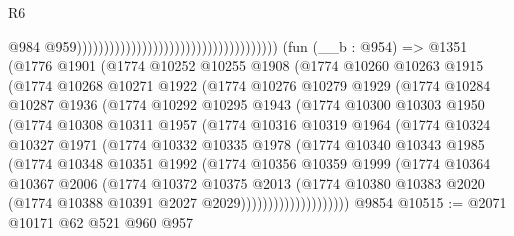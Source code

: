 \begin{lexlean}{R6}
\begin{coremodule}
                                                                              @984
                                                                              @959)))))))))))))))))))))))))))))))))))))
    (fun (__b : @954) =>
    @1351
      (@1776
        @1901
        (@1774
          @10252
          @10255
          @1908
          (@1774
            @10260
            @10263
            @1915
            (@1774
              @10268
              @10271
              @1922
              (@1774
                @10276
                @10279
                @1929
                (@1774
                  @10284
                  @10287
                  @1936
                  (@1774
                    @10292
                    @10295
                    @1943
                    (@1774
                      @10300
                      @10303
                      @1950
                      (@1774
                        @10308
                        @10311
                        @1957
                        (@1774
                          @10316
                          @10319
                          @1964
                          (@1774
                            @10324
                            @10327
                            @1971
                            (@1774
                              @10332
                              @10335
                              @1978
                              (@1774
                                @10340
                                @10343
                                @1985
                                (@1774
                                  @10348
                                  @10351
                                  @1992
                                  (@1774
                                    @10356
                                    @10359
                                    @1999
                                    (@1774
                                      @10364
                                      @10367
                                      @2006
                                      (@1774
                                        @10372
                                        @10375
                                        @2013
                                        (@1774
                                          @10380
                                          @10383
                                          @2020
                                          (@1774 @10388 @10391 @2027 @2029))))))))))))))))))))
    @9854
@10515 := @2071 @10171 @62 @521 @960 @957

\end{coremodule}
\end{lexlean}
